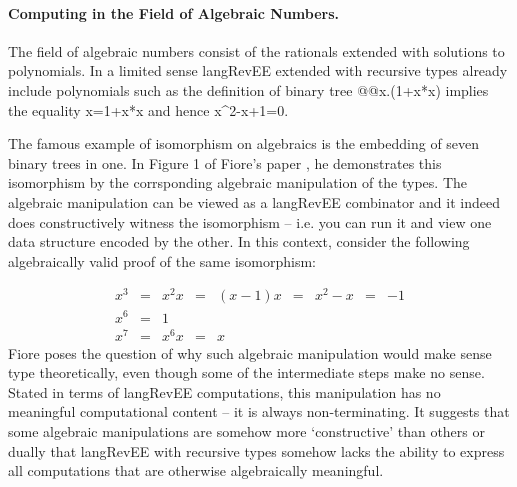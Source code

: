 \documentclass[preprint]{sigplanconf}
\begin{document}

\paragraph*{Computing in the Field of Algebraic Numbers.}
\label{sec:algebraic-field}
The field of algebraic numbers consist of the rationals extended with
solutions to polynomials. In a limited sense {{langRevEE}} extended
with recursive types already include polynomials such as the
definition of binary tree {{@@x.(1+x*x)}} implies the equality
{{x=1+x*x}} and hence {{x^2-x+1=0}}. 



The famous example of isomorphism on algebraics is the embedding of
seven binary trees in one. In Figure 1 of Fiore's paper
\cite{Fiore:2004}, he demonstrates this isomorphism by the
corrsponding algebraic manipulation of the types.  The algebraic
manipulation can be viewed as a {{langRevEE}} combinator and it indeed
does constructively witness the isomorphism -- i.e. you can run it and
view one data structure encoded by the other. In this context,
consider the following algebraically valid proof of the same
isomorphism:

\[\begin{array}{rclclclcl}
x^3 &=& x^2 x &=& (x-1) x &=& x^2 - x &=& -1 \\
x^6 &=& 1 \\
x^7 &=& x^6 x &=& x
\end{array}\]
Fiore poses the question of why such algebraic manipulation would make
sense type theoretically, even though some of the intermediate steps
make no sense.  Stated in terms of {{langRevEE}} computations, this
manipulation has no meaningful computational content -- it is always
non-terminating. It suggests that some algebraic manipulations are
somehow more `constructive' than others or dually that {{langRevEE}}
with recursive types somehow lacks the ability to express all
computations that are otherwise algebraically meaningful.
\end{document}
